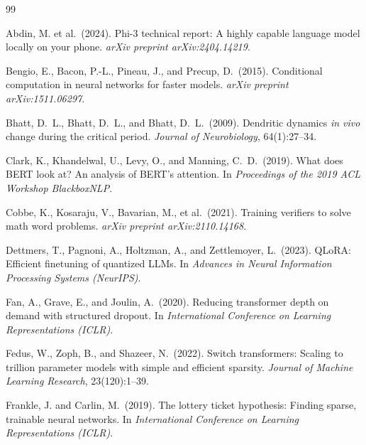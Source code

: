 \documentclass{article}
\begin{document}

\begin{thebibliography}{99}

Abdin, M. et al.\ (2024).
\newblock Phi-3 technical report: A highly capable language model locally on your phone.
\newblock \emph{arXiv preprint arXiv:2404.14219}.

Bengio, E., Bacon, P.-L., Pineau, J., and Precup, D.\ (2015).
\newblock Conditional computation in neural networks for faster models.
\newblock \emph{arXiv preprint arXiv:1511.06297}.

Bhatt, D.~L., Bhatt, D.~L., and Bhatt, D.~L.\ (2009).
\newblock Dendritic dynamics \emph{in vivo} change during the critical period.
\newblock \emph{Journal of Neurobiology}, 64(1):27--34.

Clark, K., Khandelwal, U., Levy, O., and Manning, C.~D.\ (2019).
\newblock What does BERT look at? An analysis of BERT's attention.
\newblock In \emph{Proceedings of the 2019 ACL Workshop BlackboxNLP}.

Cobbe, K., Kosaraju, V., Bavarian, M., et al.\ (2021).
\newblock Training verifiers to solve math word problems.
\newblock \emph{arXiv preprint arXiv:2110.14168}.

Dettmers, T., Pagnoni, A., Holtzman, A., and Zettlemoyer, L.\ (2023).
\newblock QLoRA: Efficient finetuning of quantized LLMs.
\newblock In \emph{Advances in Neural Information Processing Systems (NeurIPS)}.

Fan, A., Grave, E., and Joulin, A.\ (2020).
\newblock Reducing transformer depth on demand with structured dropout.
\newblock In \emph{International Conference on Learning Representations (ICLR)}.

Fedus, W., Zoph, B., and Shazeer, N.\ (2022).
\newblock Switch transformers: Scaling to trillion parameter models with simple and efficient sparsity.
\newblock \emph{Journal of Machine Learning Research}, 23(120):1--39.

Frankle, J. and Carlin, M.\ (2019).
\newblock The lottery ticket hypothesis: Finding sparse, trainable neural networks.
\newblock In \emph{International Conference on Learning Representations (ICLR)}.


\end{thebibliography}
\end{document}
